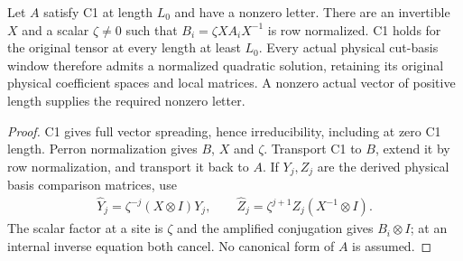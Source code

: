 \begin{lemma}
    \label{lem:quadratic_perron_normalization}
    \leanok
    Let $A$ satisfy C1 at length $L_0$ and have a nonzero letter.
    There are an invertible $X$ and a scalar $\zeta\ne0$ such that
    $B_i=\zeta X A_iX^{-1}$ is row normalized. C1 holds for the
    original tensor at every length at least $L_0$. Every actual
    physical cut-basis window therefore admits a normalized quadratic
    solution, retaining its original physical coefficient spaces and
    local matrices. A nonzero actual vector of positive length
    supplies the required nonzero letter.
\end{lemma}
\begin{proof}
    \leanok
    C1 gives full vector spreading, hence irreducibility, including
    at zero C1 length. Perron normalization gives $B$, $X$ and
    $\zeta$. Transport C1 to $B$, extend it by row normalization,
    and transport it back to $A$. If $Y_j,Z_j$ are the derived
    physical basis comparison matrices, use
    \begin{align}
        \widehat Y_j=\zeta^{-j}(X\otimes I)Y_j,\qquad
        \widehat Z_j=\zeta^{j+1}Z_j(X^{-1}\otimes I).
    \end{align}
    The scalar factor at a site is $\zeta$ and the amplified
    conjugation gives $B_i\otimes I$; at an internal inverse equation
    both cancel. No canonical form of $A$ is assumed.
\end{proof}

